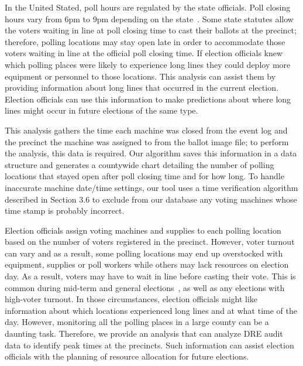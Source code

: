In the United Stated, poll hours are regulated by the state
officials. Poll closing hours vary from 6pm to 9pm depending on the
state~\cite{Info2007}. Some state statutes allow the voters waiting in
line at poll closing time to cast their ballots at the precinct;
therefore, polling locations may stay open late in order to
accommodate those voters waiting in line at the official poll closing
time. If election officials knew which polling places were likely to
experience long lines they could deploy more equipment or personnel to
those locations. This analysis can assist them by providing
information about long lines that occurred in the current election. Election
officials can use this information to make predictions about where
long lines might occur in future elections of the same type. 

This analysis gathers the time each machine was closed from the event log and
the precinct the machine was assigned to from the ballot image file; to perform
the analysis, this data is required.  Our algorithm saves this information in a
data structure and generates a countywide chart detailing the number of polling
locations that stayed open after poll closing time and for how long. To handle
inaccurate machine date/time settings, our tool uses a time verification
algorithm described in Section 3.6 to exclude from our database any voting
machines whose time stamp is probably incorrect. 

Election officials assign voting machines and supplies to each polling
location based on the number of voters registered in the precinct.
However, voter turnout can vary and as a result, some polling
locations may end up overstocked with equipment, supplies or poll
workers while others may lack resources on election day. As a result,
voters may have to wait in line before casting their vote. This is
common during mid-term and general elections~\cite{Kreitman2010,
  Slade2008, U2010}, as well as any elections with high-voter turnout.
In those circumstances, election officials might like information
about which locations experienced long lines and at what time of the
day. However, monitoring all the polling places in a large county can
be a daunting task. Therefore, we provide an analysis that can analyze
DRE audit data to identify peak times at the precincts. Such
information can assist election officials with the planning of
resource allocation for future elections.

